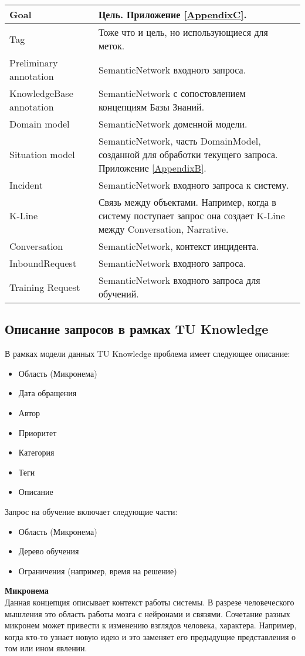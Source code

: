 \begin{longtable}{|p{5cm}|p{12cm}|}
   \hline
   Goal  & Цель. Приложение \ref{AppendixC}. \\
   \hline
   Tag & Тоже что и цель, но использующиеся для меток. \\
   \hline
   Preliminary annotation  & SemanticNetwork входного запроса. \\
   \hline
   KnowledgeBase annotation  & SemanticNetwork с сопостовлением концепциям Базы Знаний. \\
   \hline
   Domain model  & SemanticNetwork доменной модели. \\
   \hline
   Situation model  & SemanticNetwork, часть DomainModel, созданной для обработки текущего запроса. Приложение \ref{AppendixB}. \\
   \hline
   Incident  & SemanticNetwork входного запроса к систему. \\
   \hline
   K-Line  & Связь между объектами. Например, когда в систему поступает запрос она создает K-Line между Conversation, Narrative. \\
   \hline
   Conversation  & SemanticNetwork, контекст инцидента. \\
   \hline
   InboundRequest  & SemanticNetwork входного запроса. \\
   \hline
   Training Request  & SemanticNetwork входного запроса для обучений. \\
   \hline
   
  \end{longtable}

\subsection{Описание запросов в рамках TU Knowledge}
В рамках модели данных TU Knowledge проблема имеет следующее описание:
\begin{itemize}
	\item Область (Микронема)
	\item Дата обращения
	\item Автор
	\item Приоритет
	\item Категория
	\item Теги
	\item Описание
\end{itemize}
Запрос на обучение включает следующие части:
\begin{itemize}
	\item Область (Микронема)
	\item Дерево обучения
	\item Ограничения (например, время на решение)
\end{itemize}
 \textbf{Микронема} \\
Данная концепция описывает контекст работы системы. В разрезе человеческого мышления это область работы мозга с нейронами и связями. Сочетание разных микронем может привести к изменению взглядов человека, характера. Например, когда кто-то узнает новую идею и это заменяет его предыдущие представления о том или ином явлении.  
